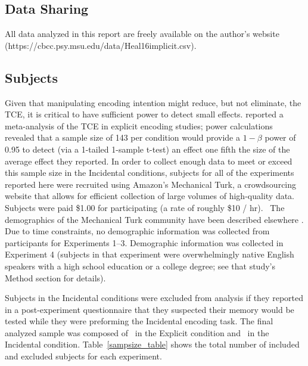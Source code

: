 \documentclass[man,natbib,floatsintext]{apa6} %
\begin{document}
\subsection{Data Sharing}All data analyzed in this report are freely available on the author's website (https://cbcc.psy.msu.edu/data/Heal16implicit.csv).

\subsection{Subjects}

Given that manipulating encoding intention might reduce, but not eliminate, the TCE, it is critical to have sufficient power to detect small effects. \citet{SedeEtal10} reported a meta-analysis of the TCE in explicit encoding studies; power calculations revealed that a sample size of 143 per condition would provide a $1-\beta$ power of 0.95 to detect (via a 1-tailed 1-sample t-test) an effect one fifth the size of the average effect they reported.
In order to collect enough data to meet or exceed this sample size in the Incidental conditions, subjects for all of the experiments reported here were recruited using Amazon's Mechanical Turk, a crowdsourcing website that allows for efficient collection of large volumes of high-quality data. Subjects were paid \$1.00 for participating (a rate of roughly \$10 / hr).~\label{TODO-10} \color{red}The demographics of the Mechanical Turk community have been described elsewhere \cite[approximately 55\% female with a mean age of 32;][]{MasoSuri12}. Due to time constraints, no demographic information was collected from participants for Experiments 1--3. Demographic information was collected in Experiment 4 (subjects in that experiment were overwhelmingly native English speakers with a high school education or a college degree; see that study's Method section for details). \color{black}

Subjects in the Incidental conditions were excluded from analysis if they reported in a post-experiment questionnaire that they suspected their memory would be tested while they were preforming the Incidental encoding task. The final analyzed sample was composed of \shoeExplicitIncluded~in the Explicit condition and \shoeIncidentalIncluded~in the Incidental condition. Table~\ref{sampsize_table} shows the total number of included and excluded subjects for each experiment.
\end{document}
